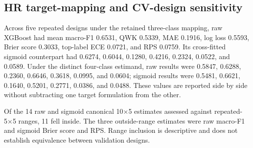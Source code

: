 \documentclass[information,article,submit,pdftex,moreauthors]{Definitions/mdpi}
\begin{document}
\begin{table}[H]
\centering\scriptsize
\caption{Proxy-use and reconstructability diagnostics}
\label{tab:9}
\end{table}

\subsection{HR target-mapping and CV-design sensitivity}

Across five repeated designs under the retained three-class mapping, raw XGBoost had mean macro-F1 0.6531, QWK 0.5339, MAE 0.1916, log loss 0.5593, Brier score 0.3033, top-label ECE 0.0721, and RPS 0.0759. Its cross-fitted sigmoid counterpart had 0.6274, 0.6044, 0.1280, 0.4216, 0.2324, 0.0522, and 0.0589. Under the distinct four-class estimand, raw results were 0.5847, 0.6288, 0.2360, 0.6646, 0.3618, 0.0995, and 0.0604; sigmoid results were 0.5481, 0.6621, 0.1640, 0.5201, 0.2771, 0.0386, and 0.0488. These values are reported side by side without subtracting one target formulation from the other.

Of the 14 raw and sigmoid canonical 10×5 estimates assessed against repeated-5×5 ranges, 11 fell inside. The three outside-range estimates were raw macro-F1 and sigmoid Brier score and RPS. Range inclusion is descriptive and does not establish equivalence between validation designs.
\end{document}
